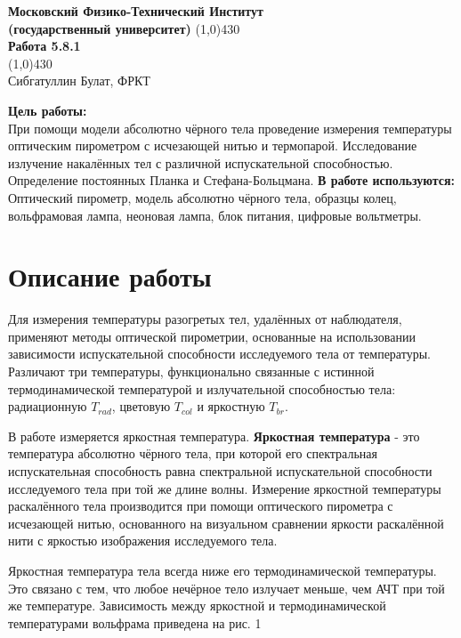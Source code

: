 \documentclass[a4paper, 12pt]{article}%
\begin{document}
\begin{titlepage}

\begin{center}
\large\textbf{Московский Физико-Технический Институт}\\
\large\textbf{(государственный университет)}
\vfill
\line(1,0){430}\\[1mm]
\huge\textbf{Работа 5.8.1}\\
\line(1,0){430}\\[1mm]
\vfill
\large Сибгатуллин Булат, ФРКТ\\
\end{center}

\end{titlepage}
\noindent \textbf{Цель работы:} \\
\indent При помощи модели абсолютно чёрного тела проведение измерения температуры оптическим пирометром с исчезающей нитью и термопарой. Исследование излучение накалённых тел с различной испускательной способностью. Определение постоянных Планка и Стефана-Больцмана.
\noindent \textbf{В работе используются:} \\
\indent Оптический пирометр, модель абсолютно чёрного тела, образцы колец, вольфрамовая лампа, неоновая лампа, блок питания, цифровые вольтметры.

\section{Описание работы}
Для измерения температуры разогретых тел, удалённых от наблюдателя, применяют методы оптической пирометрии, основанные на использовании зависимости испускательной способности исследуемого тела от температуры. Различают три температуры, функционально связанные с истинной термодинамической температурой и излучательной способностью тела: радиационную $T_{rad}$, цветовую $T_{col}$ и яркостную $T_{br}$.

В работе измеряется яркостная температура. \textbf{Яркостная температура} - это температура абсолютно чёрного тела, при которой его спектральная испускательная способность равна спектральной испускательной способности исследуемого тела при той же длине волны.
 Измерение яркостной температуры раскалённого тела производится при помощи оптического пирометра с исчезающей нитью, основанного на визуальном сравнении яркости раскалённой нити с яркостью изображения исследуемого тела.
 
Яркостная температура тела всегда ниже его термодинамической температуры. Это связано с тем, что любое нечёрное тело излучает меньше, чем АЧТ при той же температуре. Зависимость между яркостной и термодинамической температурами вольфрама приведена на рис. 1
\end{document}
